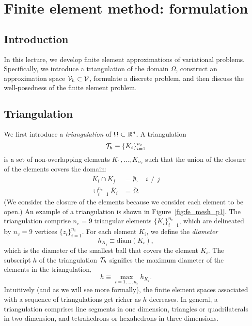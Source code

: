 \chapter{Finite element method: formulation}

\disclaimer

\section{Introduction}
In this lecture, we develop finite element approximations of variational problems.  Specifically, we introduce a triangulation of the domain $\Omega$, construct an approximation space $\mathcal{V}_h \subset \mathcal{V}$, formulate a discrete problem, and then discuss the well-posedness of the finite element problem.

\section{Triangulation}
We first introduce a \emph{triangulation} of $\Omega \subset \mathbb{R}^d$.  A triangulation
\begin{equation*}
  \mathcal{T}_h \equiv \{ K_i \}_{i=1}^{n_e}
\end{equation*}
is a set of non-overlapping elements $K_1, \dots, K_{n_e}$ such that the union of the closure of the elements covers the domain:
\begin{align*}
  K_i \cap K_j &= \emptyset,  \quad i \neq j \\
  \cup_{i=1}^{n_e} \overline K_i &= \overline \Omega.
\end{align*}
(We consider the closure of the elements because we consider each element to be open.) An example of a triangulation is shown in Figure~\ref{fig:fe_mesh_p1}. The triangulation comprise $n_e = 9$ triangular elements $\{K_i\}_{i=1}^{n_e}$, which are delineated by $n_v = 9$ vertices $\{z_i\}_{i=1}^{n_v}$. For each element $K_i$, we define the \emph{diameter}
\begin{equation*}
  h_{K_i} \equiv \text{diam}(K_i),
\end{equation*}
which is the diameter of the smallest ball that covers the element $K_i$. The subscript $h$ of the triangulation $\mathcal{T}_h$ signifies the maximum diameter of the elements in the triangulation,
\begin{equation*}
  h \equiv \max_{i = 1,\dots,n_e} h_{K_i}.
\end{equation*}
  Intuitively (and as we will see more formally), the finite element spaces associated with a sequence of triangulations get richer as $h$ decreases.  In general, a triangulation comprises line segments in one dimension, triangles or quadrilaterals in two dimension, and tetrahedrons or hexahedrons in three dimensions.


